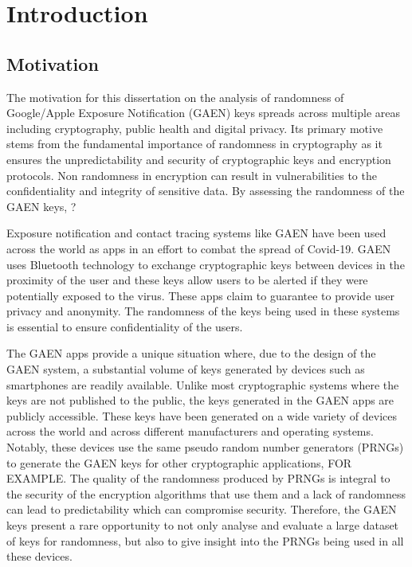 \chapter{Introduction}

\section{Motivation}

The motivation for this dissertation on the analysis of randomness of Google/Apple Exposure Notification (GAEN) keys spreads across multiple areas including cryptography, public health and digital privacy. Its primary motive stems from the fundamental importance of randomness in cryptography as it ensures the unpredictability and security of cryptographic keys and encryption protocols. Non randomness in encryption can result in vulnerabilities to the confidentiality and integrity of sensitive data. By assessing the randomness of the GAEN keys, ? \newline

Exposure notification and contact tracing systems like GAEN have been used across the world as apps in an effort to combat the spread of Covid-19. GAEN uses Bluetooth technology to exchange cryptographic keys between devices in the proximity of the user and these keys allow users to be alerted if they were potentially exposed to the virus. These apps claim to guarantee to provide user privacy and anonymity. The randomness of the keys being used in these systems is essential to ensure confidentiality of the users.\newline

The GAEN apps provide a unique situation where, due to the design of the GAEN system, a substantial volume of keys generated by devices such as smartphones are readily available. Unlike most cryptographic systems where the keys are not published to the public, the keys generated in the GAEN apps are publicly accessible. These keys have been generated on a wide variety of devices across the world and across different manufacturers and operating systems. Notably, these devices use the same pseudo random number generators (PRNGs) to generate the GAEN keys for other cryptographic applications, FOR EXAMPLE. The quality of the randomness produced by PRNGs is integral to the security of the encryption algorithms that use them and a lack of randomness can lead to predictability which can compromise security. Therefore, the GAEN keys present a rare opportunity to not only analyse and evaluate a large dataset of keys for randomness, but also to give insight into the PRNGs being used in all these devices. \newline

